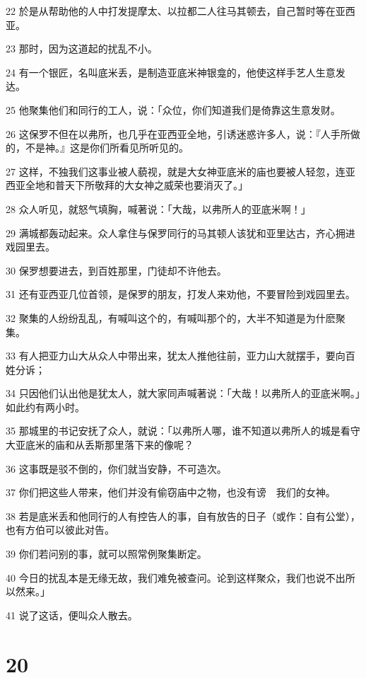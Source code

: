 \par 22 於是从帮助他的人中打发提摩太、以拉都二人往马其顿去，自己暂时等在亚西亚。
\par 23 那时，因为这道起的扰乱不小。
\par 24 有一个银匠，名叫底米丢，是制造亚底米神银龛的，他使这样手艺人生意发达。
\par 25 他聚集他们和同行的工人，说：「众位，你们知道我们是倚靠这生意发财。
\par 26 这保罗不但在以弗所，也几乎在亚西亚全地，引诱迷惑许多人，说：『人手所做的，不是神。』这是你们所看见所听见的。
\par 27 这样，不独我们这事业被人藐视，就是大女神亚底米的庙也要被人轻忽，连亚西亚全地和普天下所敬拜的大女神之威荣也要消灭了。」
\par 28 众人听见，就怒气填胸，喊著说：「大哉，以弗所人的亚底米啊！」
\par 29 满城都轰动起来。众人拿住与保罗同行的马其顿人该犹和亚里达古，齐心拥进戏园里去。
\par 30 保罗想要进去，到百姓那里，门徒却不许他去。
\par 31 还有亚西亚几位首领，是保罗的朋友，打发人来劝他，不要冒险到戏园里去。
\par 32 聚集的人纷纷乱乱，有喊叫这个的，有喊叫那个的，大半不知道是为什麽聚集。
\par 33 有人把亚力山大从众人中带出来，犹太人推他往前，亚力山大就摆手，要向百姓分诉；
\par 34 只因他们认出他是犹太人，就大家同声喊著说：「大哉！以弗所人的亚底米啊。」如此约有两小时。
\par 35 那城里的书记安抚了众人，就说：「以弗所人哪，谁不知道以弗所人的城是看守大亚底米的庙和从丢斯那里落下来的像呢？
\par 36 这事既是驳不倒的，你们就当安静，不可造次。
\par 37 你们把这些人带来，他们并没有偷窃庙中之物，也没有谤　我们的女神。
\par 38 若是底米丢和他同行的人有控告人的事，自有放告的日子（或作：自有公堂），也有方伯可以彼此对告。
\par 39 你们若问别的事，就可以照常例聚集断定。
\par 40 今日的扰乱本是无缘无故，我们难免被查问。论到这样聚众，我们也说不出所以然来。」
\par 41 说了这话，便叫众人散去。

\chapter{20}

